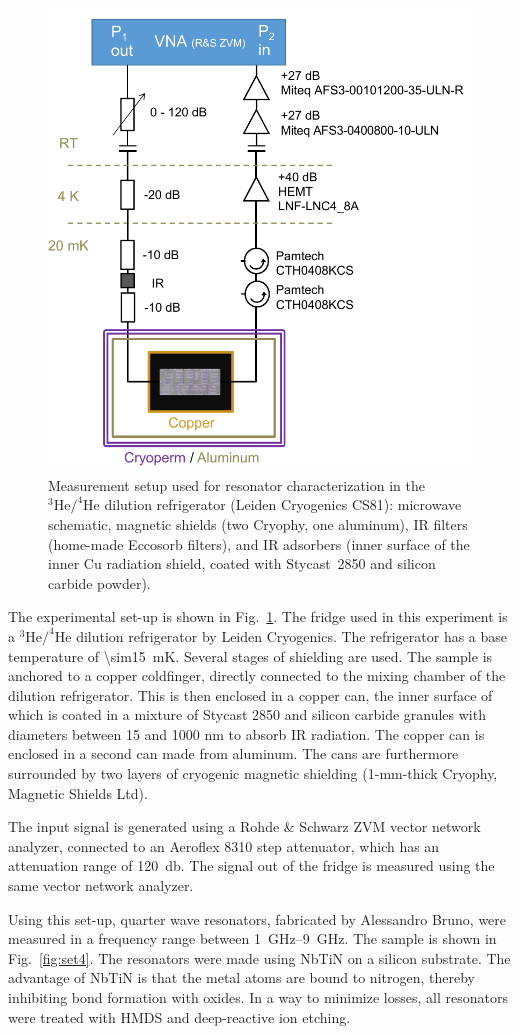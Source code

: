     \begin{figure}[!htb]
      \includegraphics[width=.5\textwidth]{Figures/DRIE/FigS2_MW_setup.pdf}
      \caption[width=\textwidth]{Measurement setup used for resonator characterization in the $^{3}\mathrm{He}/^{4}\mathrm{He}$ dilution refrigerator (Leiden Cryogenics CS81): microwave schematic, magnetic shields (two Cryophy, one aluminum), IR filters (home-made Eccosorb filters), and IR adsorbers (inner surface of the inner Cu radiation shield, coated with Stycast~2850 and silicon carbide powder).}
      \label{fig:fridges}
    \end{figure}
    The experimental set-up is shown in Fig.~\ref{fig:fridges}. The fridge used in this experiment is a $^{3}\mathrm{He}/^{4}\mathrm{He}$ dilution refrigerator by Leiden Cryogenics. The refrigerator has a base temperature of \SI{\sim15}{\milli \kelvin}. Several stages of shielding are used. The sample is anchored to a copper coldfinger, directly connected to the mixing chamber of the dilution refrigerator. This is then enclosed in a copper can, the inner surface of which is coated in a mixture of Stycast 2850 and silicon carbide granules with diameters between 15 and 1000 nm to absorb IR radiation. The copper can is enclosed in a second can made from aluminum. The cans are furthermore surrounded by two layers of cryogenic magnetic shielding (1-mm-thick Cryophy, Magnetic Shields Ltd).

    The input signal is generated using a Rohde \& Schwarz ZVM vector network analyzer, connected to an Aeroflex 8310 step attenuator, which has an attenuation range of \SI{120}{\decibel}. The signal out of the fridge is measured using the same vector network analyzer.

    Using this set-up, quarter wave resonators, fabricated by Alessandro Bruno, were measured in a frequency range between \SIrange{1}{9}{\giga \hertz}. The sample is shown in Fig.~\ref{fig:set4}. The resonators were made using NbTiN on a silicon substrate. The advantage of NbTiN is that the metal atoms are bound to nitrogen, thereby inhibiting bond formation with oxides. In a way to minimize losses, all resonators were treated with HMDS and deep-reactive ion etching.


